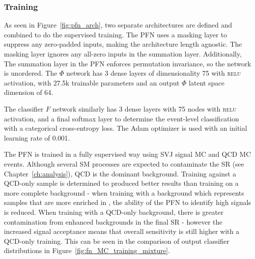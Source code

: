 \subsubsection{Training}
\label{sec:pfn_training}

As seen in Figure~\ref{fig:pfn_arch}, two separate architectures are defined and combined to do the supervised training. The PFN uses a masking layer to suppress any zero-padded inputs, making the architecture length agnostic. The masking layer ignores any all-zero inputs in the summation layer. Additionally, The summation layer in the PFN enforces permutation invariance, so the network is unordered. The $\Phi$ network has 3 dense layers of dimensionality 75 with \textsc{relu} activation, with 27.5k trainable parameters and an output $\Phi$ latent space dimension of 64. \par

The classifier $F$ network similarly has 3 dense layers with 75 nodes with \textsc{relu} activation, and a final softmax layer to determine the event-level classification with a categorical cross-entropy loss. The Adam optimizer is used with an initial learning rate of 0.001. \par

The PFN is trained in a fully supervised way using SVJ signal MC and QCD MC events. Although several SM processes are expected to contaminate the SR (see Chapter~\ref{ch:analysis}), QCD is the dominant background. Training against a QCD-only sample is determined to produced better results than training on a more complete background - when training with a background which represents samples that are more enriched in \met, the ability of the PFN to identify high \met signals is reduced. When training with a QCD-only background, there is greater contamination from \met enhanced backgrounds in the final SR - however the increased signal acceptance means that overall sensitivity is still higher with a QCD-only training. This can be seen in the comparison of output classifier distributions in Figure~\ref{fig:fn_MC_training_mixture}.

